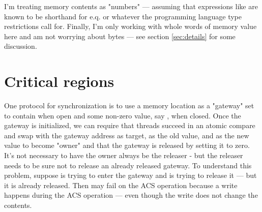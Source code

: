 \documentclass[english,11pt]{article}
\begin{document}
I'm treating memory contents as "numbers" --- assuming that expressions like
 are known to be shorthand for e.q.
 or whatever the programming language type
restrictions call for.
Finally, I'm only working with whole words of memory value here and am not
worrying about bytes --- see section \ref{sec:details} for some discussion.

\section{Critical regions}

One protocol for synchronization is to use a memory location as a "gateway" set to contain  when open and some non-zero value, say , when closed. 
Once the gateway is initialized, we can require that threads succeed in an
atomic compare and swap with the gateway address as target,  as the old
value, and  as the new value to become "owner" and that the gateway is
released by setting it to zero. It's not necessary to have the owner always
be the releaser - but the releaser needs to be sure not to release an already
released gateway.
To understand this problem, suppose  is trying to enter
the gateway and  is trying to release it --- but it is already released.
Then  may fail on the ACS operation because a write happens during
the ACS operation --- even though the write does not change the contents.
\end{document}
